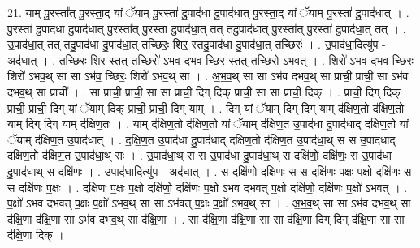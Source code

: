 \documentclass[17pt]{extarticle}
\begin{document}
21. याम् पु॒रस्ता᳚त् पु॒रस्ता॒द् यां ॅयाम् पु॒रस्ता॑ दु॒पाद॑धा दु॒पाद॑धात् पु॒रस्ता॒द् यां ॅयाम् पु॒रस्ता॑ दु॒पाद॑धात् । . पु॒रस्ता॑ दु॒पाद॑धा दु॒पाद॑धात् पु॒रस्ता᳚त् पु॒रस्ता॑ दु॒पाद॑धा॒त् तत् तदु॒पाद॑धात् पु॒रस्ता᳚त् पु॒रस्ता॑
दु॒पाद॑धा॒त् तत् । . उ॒पाद॑धा॒त् तत् तदु॒पाद॑धा दु॒पाद॑धा॒त् तच्छिरः॒ शिर॒ स्तदु॒पाद॑धा दु॒पाद॑धा॒त् तच्छिरः॑ । . उ॒पाद॑धा॒दित्यु॑प - अद॑धात् । . तच्छिरः॒ शिर॒ स्तत् तच्छिरो॑ ऽभव दभव॒ च्छिर॒ स्तत् तच्छिरो॑ ऽभवत् । . शिरो॑ ऽभव दभव॒ च्छिरः॒ शिरो॑ ऽभव॒थ् सा सा ऽभ॑व॒
च्छिरः॒ शिरो॑ ऽभव॒थ् सा । . अ॒भ॒व॒थ् सा सा ऽभ॑व दभव॒थ् सा प्राची॒ प्राची॒ सा ऽभ॑व दभव॒थ् सा प्राची᳚ । . सा प्राची॒ प्राची॒ सा सा प्राची॒ दिग् दिक् प्राची॒ सा सा प्राची॒ दिक् । . प्राची॒ दिग् दिक् प्राची॒ प्राची॒ दिग् यां ॅयाम् दिक् प्राची॒ प्राची॒ दिग् याम् । . दिग् यां ॅयाम् दिग् दिग् याम् द॑क्षिण॒तो द॑क्षिण॒तो याम् दिग् दिग् याम् द॑क्षिण॒तः । . याम् द॑क्षिण॒तो द॑क्षिण॒तो यां ॅयाम् द॑क्षिण॒त उ॒पाद॑धा दु॒पाद॑धाद् दक्षिण॒तो यां ॅयाम् द॑क्षिण॒त उ॒पाद॑धात् । . द॒क्षि॒ण॒त उ॒पाद॑धा दु॒पाद॑धाद् दक्षिण॒तो द॑क्षिण॒त उ॒पाद॑धा॒थ् स स उ॒पाद॑धाद् दक्षिण॒तो द॑क्षिण॒त उ॒पाद॑धा॒थ् सः । . उ॒पाद॑धा॒थ् स स उ॒पाद॑धा दु॒पाद॑धा॒थ् स दक्षि॑णो॒ दक्षि॑णः॒ स उ॒पाद॑धा दु॒पाद॑धा॒थ् स दक्षि॑णः । . उ॒पाद॑धा॒दित्यु॑प - अद॑धात् । . स दक्षि॑णो॒ दक्षि॑णः॒ स स दक्षि॑णः प॒क्षः प॒क्षो दक्षि॑णः॒ स स दक्षि॑णः प॒क्षः । . दक्षि॑णः प॒क्षः प॒क्षो दक्षि॑णो॒ दक्षि॑णः प॒क्षो॑ ऽभव दभवत् प॒क्षो दक्षि॑णो॒ दक्षि॑णः प॒क्षो॑ ऽभवत् । . प॒क्षो॑ ऽभव दभवत् प॒क्षः प॒क्षो॑ ऽभव॒थ् सा सा ऽभ॑वत् प॒क्षः प॒क्षो॑ ऽभव॒थ् सा । . अ॒भ॒व॒थ् सा सा ऽभ॑व दभव॒थ् सा द॑क्षि॒णा द॑क्षि॒णा सा ऽभ॑व दभव॒थ् सा द॑क्षि॒णा । . सा द॑क्षि॒णा द॑क्षि॒णा सा सा द॑क्षि॒णा दिग् दिग् द॑क्षि॒णा सा सा द॑क्षि॒णा दिक् । \newline
\end{document}

